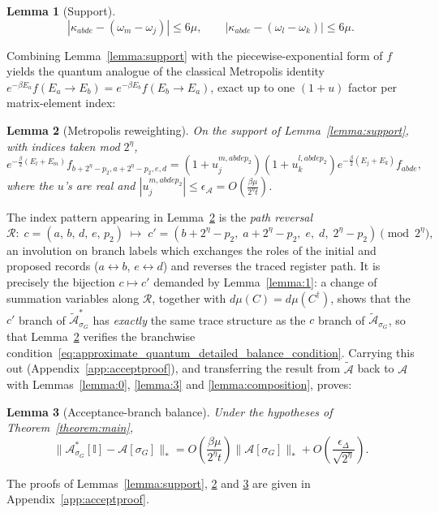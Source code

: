 \documentclass[aps,floatfix,10pt,amssymb,amsfont,amsmath,superscriptaddress,float,nofootinbib,longbibliography,nobalancelastpage,twocolumn]{revtex4-2}
\newtheorem{lemma}{Lemma}
\begin{document}
\begin{widetext}
\begin{lemma}[Support]
\begin{equation}
    \left|\kappa_{abde}-(\omega_m-\omega_j)\right|\leq 6\mu, \qquad
    \left|\kappa_{abde}-(\omega_l-\omega_k)\right|\leq 6\mu .
\end{equation}
\end{lemma}
Combining Lemma~\ref{lemma:support} with the piecewise-exponential form of $f$ yields the quantum analogue of the classical Metropolis identity $e^{-\beta E_a}f(E_a \to E_b) = e^{-\beta E_b}f(E_b \to E_a)$, exact up to one $(1+u)$ factor per matrix-element index:
\begin{lemma}[Metropolis reweighting]
\label{lemma:reweight}
On the support of Lemma~\ref{lemma:support}, with indices taken mod $2^{\eta}$,
\begin{equation}
e^{-\frac{\beta}{2}(E_l+E_m)}f_{b+2^{\eta}-p_2,a+2^{\eta}-p_2,e,d}
=(1+u_j^{m,abdep_2})(1+u_k^{l,abdep_2})e^{-\frac{\beta}{2}(E_j+E_k)}f_{abde},
\end{equation}
where the $u$'s are real and $|u_j^{m,abdep_2}| \leq \epsilon_{\mathcal{A}} = O(\frac{\beta\mu}{2^{\eta}t})$.
\end{lemma}
The index pattern appearing in Lemma~\ref{lemma:reweight} is the \emph{path reversal}
\begin{equation}
    \mathcal{R}: \; c = (a,\,b,\,d,\,e,\,p_2) \;\longmapsto\; c' = (b+2^{\eta}-p_2,\; a+2^{\eta}-p_2,\; e,\; d,\; 2^{\eta}-p_2) \pmod{2^{\eta}},
    \label{eq:reversalmap}
\end{equation}
an involution on branch labels which exchanges the roles of the initial and proposed records ($a \leftrightarrow b$, $e \leftrightarrow d$) and reverses the traced register path. It is precisely the bijection $c \mapsto c'$ demanded by Lemma~\ref{lemma:1}: a change of summation variables along $\mathcal{R}$, together with $d\mu(C) = d\mu(C^{\dagger})$, shows that the $c'$ branch of $\tilde{\mathcal{A}}^*_{\sigma_G}$ has \emph{exactly} the same trace structure as the $c$ branch of $\tilde{\mathcal{A}}_{\sigma_G}$, so that Lemma~\ref{lemma:reweight} verifies the branchwise condition~\eqref{eq:approximate_quantum_detailed_balance_condition}. Carrying this out (Appendix~\ref{app:acceptproof}), and transferring the result from $\tilde{\mathcal{A}}$ back to $\mathcal{A}$ with Lemmas~\ref{lemma:0}, \ref{lemma:3} and \ref{lemma:composition}, proves:
\begin{lemma}[Acceptance-branch balance]
\label{lemma:A}
Under the hypotheses of Theorem~\ref{theorem:main},
\begin{equation}
    \|\mathcal{A}^*_{\sigma_G}[\mathbb{I}] - \mathcal{A}[\sigma_G]\|_* = O\!\left(\frac{\beta\mu}{2^{\eta}t}\right)\|\mathcal{A}[\sigma_G]\|_* + O\!\left(\frac{\epsilon_{\Delta}}{\sqrt{2^{\eta}}}\right).
\end{equation}
\end{lemma}
The proofs of Lemmas~\ref{lemma:support}, \ref{lemma:reweight} and \ref{lemma:A} are given in Appendix~\ref{app:acceptproof}.
\end{widetext}
\end{document}
